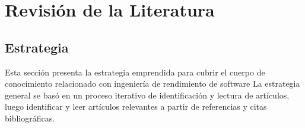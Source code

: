 \documentclass[11pt, twoside]{report}
\begin{document}
%
%
%
%



\chapter{Revisión de la Literatura}

\section{Estrategia}
Esta sección presenta la estrategia emprendida para cubrir el cuerpo de conocimiento relacionado con ingeniería de rendimiento de software La estrategia general se basó en un proceso iterativo de identificación y lectura de artículos, luego identificar y leer artículos relevantes a partir de referencias y citas bibliográficas.
\end{document}
